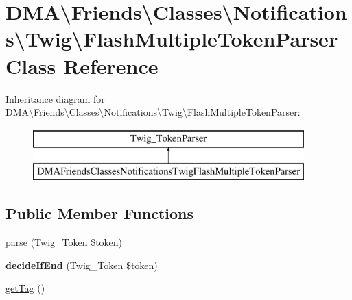 \hypertarget{classDMA_1_1Friends_1_1Classes_1_1Notifications_1_1Twig_1_1FlashMultipleTokenParser}{\section{D\+M\+A\textbackslash{}Friends\textbackslash{}Classes\textbackslash{}Notifications\textbackslash{}Twig\textbackslash{}Flash\+Multiple\+Token\+Parser Class Reference}
\label{classDMA_1_1Friends_1_1Classes_1_1Notifications_1_1Twig_1_1FlashMultipleTokenParser}
}
Inheritance diagram for D\+M\+A\textbackslash{}Friends\textbackslash{}Classes\textbackslash{}Notifications\textbackslash{}Twig\textbackslash{}Flash\+Multiple\+Token\+Parser\+:\begin{figure}[H]
\begin{center}
\leavevmode
\includegraphics[height=2.000000cm]{d7/d2c/classDMA_1_1Friends_1_1Classes_1_1Notifications_1_1Twig_1_1FlashMultipleTokenParser}
\end{center}
\end{figure}
\subsection*{Public Member Functions}
\begin{DoxyCompactItemize}
\item 
\hyperlink{classDMA_1_1Friends_1_1Classes_1_1Notifications_1_1Twig_1_1FlashMultipleTokenParser_a73e24854cc05f744decb4d0769b2dd84}{parse} (Twig\+\_\+\+Token \$token)
\item 
\hypertarget{classDMA_1_1Friends_1_1Classes_1_1Notifications_1_1Twig_1_1FlashMultipleTokenParser_afad4687567f31be1db4e56df268bc0ca}{{\bfseries decide\+If\+End} (Twig\+\_\+\+Token \$token)}\label{classDMA_1_1Friends_1_1Classes_1_1Notifications_1_1Twig_1_1FlashMultipleTokenParser_afad4687567f31be1db4e56df268bc0ca}

\item 
\hyperlink{classDMA_1_1Friends_1_1Classes_1_1Notifications_1_1Twig_1_1FlashMultipleTokenParser_aaf7a39a5197184382a689e49d0de53e6}{get\+Tag} ()
\end{DoxyCompactItemize}


